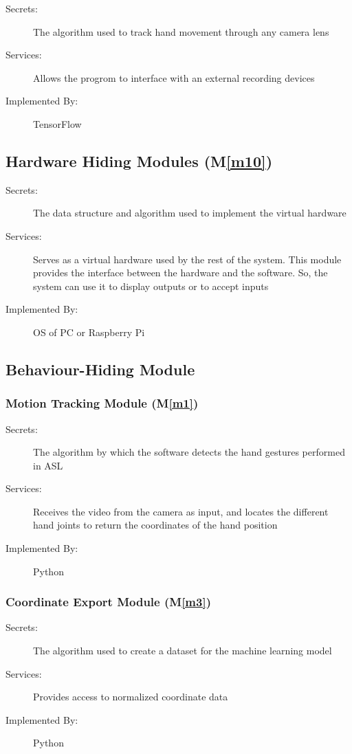 \documentclass[12pt, titlepage]{article}
\newcommand{\mref}[1]{M\ref{#1}}
\begin{document}
\begin{description}
  \item[Secrets:] The algorithm used to track hand movement through any camera lens
  \item[Services:] Allows the progrom to interface with an external recording devices
  \item[Implemented By:] TensorFlow
  \end{description}

\subsection{Hardware Hiding Modules (\mref{m10})}

\begin{description}
  \item[Secrets:] The data structure and algorithm used to implement the virtual hardware
  \item[Services:] Serves as a virtual hardware used by the rest of the system. This module provides the interface between the hardware and the software. So, the system can use it to display outputs or to accept inputs
  \item[Implemented By:] OS of PC or Raspberry Pi
  \end{description}

\subsection{Behaviour-Hiding Module}

\subsubsection{Motion Tracking Module (\mref{m1})}

\begin{description}
  \item[Secrets:] The algorithm by which the software detects the hand gestures performed in ASL
  \item[Services:] Receives the video from the camera as input, and locates the different hand joints to return the coordinates of the hand position
  \item[Implemented By:] Python
  \end{description}


\subsubsection{Coordinate Export Module (\mref{m3})}
\begin{description}
  \item[Secrets:] The algorithm used to create a dataset for the machine learning model
  \item[Services:] Provides access to normalized coordinate data
  \item[Implemented By:] Python
  \end{description}
\end{document}
